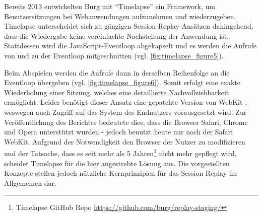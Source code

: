 Bereits 2013 entwickelten Burg \etal \cite{TimelapsePaper} mit \enquote{Timelapse} ein Framework, um Benutzersitzungen bei Webanwendungen aufzunehmen und wiederzugeben. Timelapse unterscheidet sich zu gängigen Session-Replay-Ansätzen dahingehend, dass die Wiedergabe keine vereinfachte Nachstellung der Anwendung ist. Stattdessen wird die JavaScript-Eventloop abgekapselt und es werden die Aufrufe von und zu der Eventloop mitgeschnitten (vgl. \autoref{fig:timelapse_figure5}).

Beim Abspielen werden die Aufrufe dann in derselben Reihenfolge an die Eventloop übergeben (vgl. \autoref{fig:timelapse_figure6}). Somit erfolgt eine exakte Wiederholung einer Sitzung, welches eine detaillierte Nachvollziehbarkeit ermöglicht. Leider benötigt dieser Ansatz eine gepatchte Version von WebKit \cite{WebKit}, weswegen auch Zugriff auf das System des Endnutzers vorausgesetzt wird. Zur Veröffentlichung des Berichtes bedeutete dies, dass die Browser Safari, Chrome und Opera unterstützt wurden - jedoch benutzt heute nur noch der Safari WebKit. Aufgrund der Notwendigkeit den Browser der Nutzer zu modifizieren und der Tatsache, dass es seit mehr als 5 Jahren\footnote{Timelapse GitHub Repo \url{https://github.com/burg/replay-staging/}} nicht mehr gepflegt wird, scheidet Timelapse für die hier angestrebte Lösung aus. Die vorgestellten Konzepte stellen jedoch nützliche Kernprinzipien für das Session Replay im Allgemeinen dar.